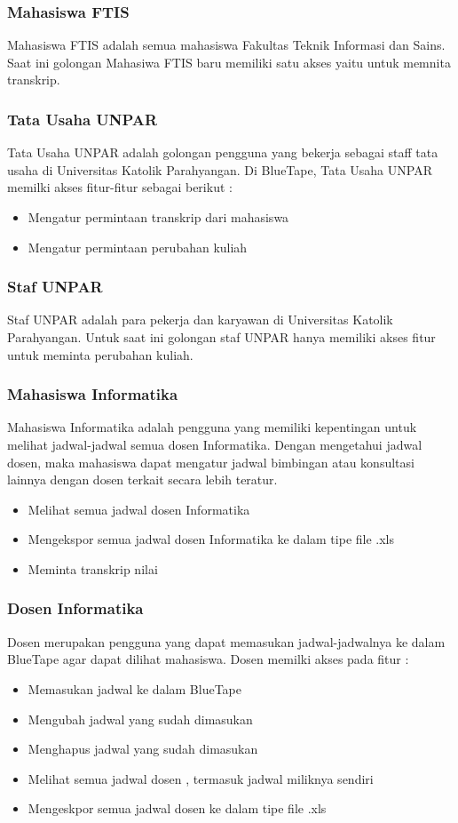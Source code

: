 \subsubsection{Mahasiswa FTIS}
Mahasiswa FTIS adalah semua mahasiswa Fakultas Teknik Informasi dan Sains. Saat ini golongan Mahasiwa FTIS baru memiliki satu akses yaitu untuk memnita transkrip.


\subsubsection{Tata Usaha UNPAR}
Tata Usaha UNPAR adalah golongan pengguna yang bekerja sebagai staff tata usaha di Universitas Katolik Parahyangan. Di BlueTape, Tata Usaha UNPAR memilki akses fitur-fitur sebagai berikut :
\begin{itemize}
	\item Mengatur permintaan transkrip dari mahasiswa
	\item Mengatur permintaan perubahan kuliah 
\end{itemize}

\subsubsection{Staf UNPAR}
Staf UNPAR adalah para pekerja dan karyawan di Universitas Katolik Parahyangan. Untuk saat ini golongan staf UNPAR hanya memiliki akses fitur untuk meminta perubahan kuliah.

\subsubsection{Mahasiswa Informatika}
Mahasiswa Informatika adalah pengguna yang memiliki kepentingan untuk melihat jadwal-jadwal semua dosen Informatika. Dengan mengetahui jadwal dosen, maka mahasiswa dapat mengatur jadwal bimbingan atau konsultasi lainnya dengan dosen terkait secara lebih teratur. 
\begin{itemize}
	\item Melihat semua jadwal dosen Informatika
	\item Mengekspor semua jadwal dosen Informatika ke dalam tipe file .xls
	\item Meminta transkrip nilai
\end{itemize}

\subsubsection{Dosen Informatika}
Dosen merupakan pengguna yang dapat memasukan jadwal-jadwalnya ke dalam BlueTape agar dapat dilihat mahasiswa. Dosen memilki akses pada fitur :
\begin{itemize}
	\item Memasukan jadwal ke dalam BlueTape
	\item Mengubah jadwal yang sudah dimasukan  
	\item Menghapus jadwal yang sudah dimasukan
	\item Melihat semua jadwal dosen , termasuk jadwal miliknya sendiri
	\item Mengeskpor semua jadwal dosen ke dalam tipe file .xls
\end{itemize}